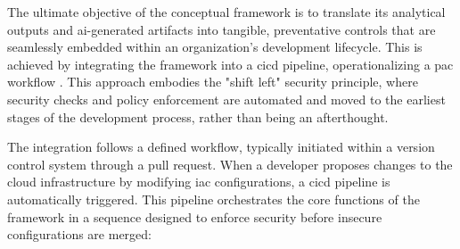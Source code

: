 The ultimate objective of the conceptual framework is to translate its analytical outputs and \gls{ai}-generated artifacts into tangible, preventative controls that are seamlessly embedded within an organization's development lifecycle. This is achieved by integrating the framework into a \gls{cicd} pipeline, operationalizing a \gls{pac} workflow \cite{sarathe_krisshnan_jutoo_vijayaraghavan_policy_2025}. This approach embodies the "shift left" security principle, where security checks and policy enforcement are automated and moved to the earliest stages of the development process, rather than being an afterthought.

The integration follows a defined workflow, typically initiated within a version control system through a pull request. When a developer proposes changes to the cloud infrastructure by modifying \gls{iac} configurations, a \gls{cicd} pipeline is automatically triggered. This pipeline orchestrates the core functions of the framework in a sequence designed to enforce security before insecure configurations are merged:

